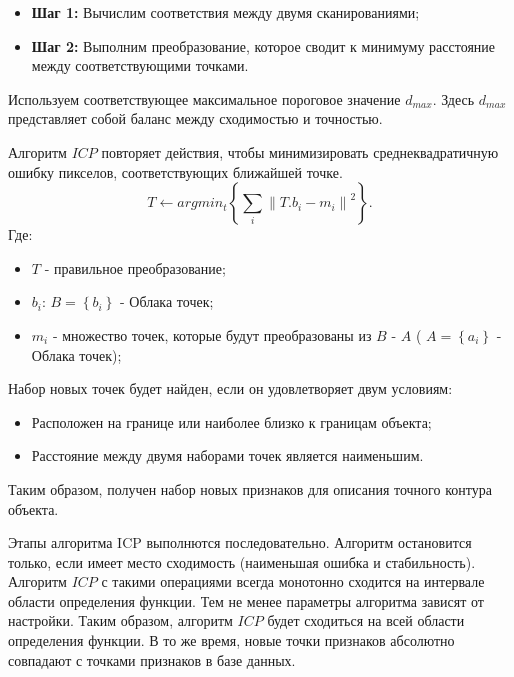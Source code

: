 \begin{itemize}
	\item \textbf{Шаг 1:} Вычислим соответствия между двумя сканированиями;
	\item \textbf{Шаг 2:} Выполним преобразование, которое сводит к минимуму расстояние между соответствующими точками.
\end{itemize}
Используем соответствующее максимальное пороговое значение $d_{max}$. Здесь $d_{max}$ представляет собой баланс между сходимостью и точностью.

Алгоритм $ICP$ повторяет действия, чтобы минимизировать среднеквадратичную ошибку пикселов, соответствующих ближайшей точке.
\begin{equation}\label{eq26}
T\leftarrow argmin_t\left\{\sum_i\left\|T.b_i - m_i\right\|^2\right\}.
\end{equation}
Где:

\begin{itemize}
	\item $T$ - правильное преобразование;
	\item $b_i$: $B=\left\{b_i\right\}$ - Облака точек;
	\item $m_i$ - множество точек, которые будут преобразованы из $B$ - $A$ ( $A=\left\{a_i\right\}$ - Облака точек);
\end{itemize}

Набор новых точек будет найден, если он удовлетворяет двум условиям:

\begin{itemize}
	\item Расположен на границе или наиболее близко к границам объекта;
	\item Расстояние между двумя наборами точек является наименьшим.
\end{itemize}
Таким образом, получен набор новых признаков для описания точного контура объекта.

Этапы алгоритма ICP выполнются последовательно. Алгоритм остановится только, если имеет место сходимость (наименьшая ошибка и стабильность). Алгоритм $ICP$ с такими операциями всегда монотонно сходится на интервале области определения функции. Тем не менее параметры алгоритма зависят от настройки. Таким образом, алгоритм $ICP$ будет сходиться на всей области определения функции. В то же время, новые точки признаков абсолютно совпадают с точками признаков в базе данных.